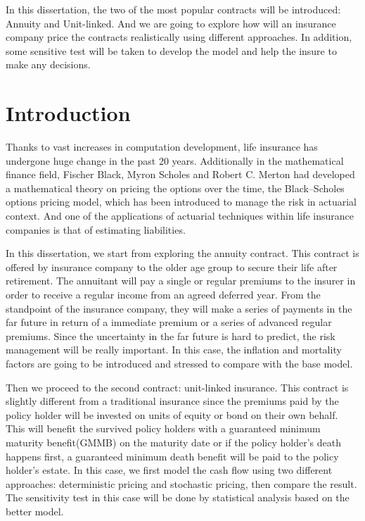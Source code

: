\documentclass{report}
\begin{document}
In this dissertation, the two of the most popular contracts will be introduced: Annuity and Unit-linked. And we are going to explore how will an insurance company price the contracts realistically using different approaches.  In addition, some sensitive test will be taken to develop the model and help the insure to make any decisions.






\chapter*{Introduction}


Thanks to vast increases in computation development, life insurance has undergone huge change in the past 20 years. Additionally in the mathematical finance field, Fischer Black, Myron Scholes and Robert C. Merton had developed a mathematical theory on pricing the options over the time, the Black–Scholes options pricing model, which has been introduced to manage the risk in actuarial context. And one of the applications of actuarial techniques within life insurance companies is that of estimating liabilities.


In this dissertation, we start from exploring the annuity contract. This contract is offered by insurance company to the older age group to secure their life after retirement. The annuitant will pay a single or regular premiums to the insurer in order to receive a regular income from an agreed deferred year. From the standpoint of the insurance company, they will make a series of payments in the far future in return of a immediate premium or a series of advanced regular premiums. Since the uncertainty in the far future is hard to predict, the risk management will be really important. In this case, the inflation and mortality factors are going to be introduced and stressed to compare with the base model.


Then we proceed to the second contract: unit-linked insurance. This contract is slightly different from a traditional insurance since the premiums paid by the policy holder will be invested on units of equity or bond on their own behalf.  This will benefit the survived policy holders with a guaranteed minimum maturity benefit(GMMB) on the maturity date or if the policy holder's death happens first, a guaranteed minimum death benefit will be paid to the policy holder's estate. In this case, we first model the cash flow using two different approaches: deterministic pricing and stochastic pricing, then compare the result. The sensitivity test in this case will be done by statistical analysis based on the better model.
\end{document}

